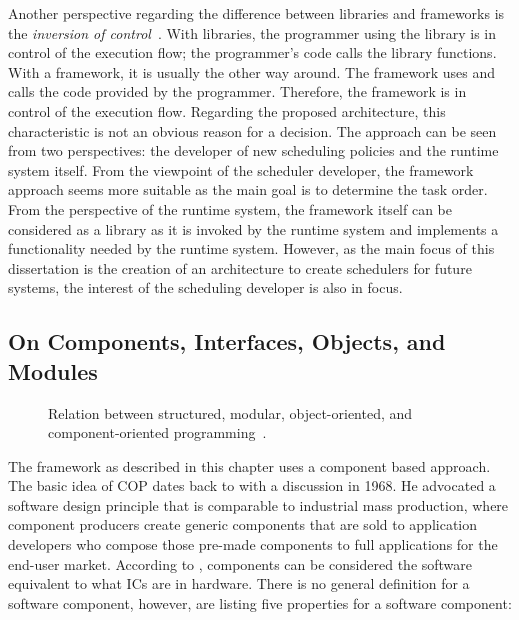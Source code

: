 Another perspective regarding the difference between libraries and frameworks is the \emph{inversion of control}~\cite[\cf{}][]{Fayad-1997-Frameworks}. With libraries, the programmer using the library is in control of the execution flow; the programmer's code calls the library functions. With a framework, it is usually the other way around. The framework uses and calls the code provided by the programmer. Therefore, the framework is in control of the execution flow. Regarding the proposed \cobas{} architecture, this characteristic is not an obvious reason for a decision. The \cobas{} approach can be seen from two perspectives: the developer of new scheduling policies and the runtime system itself. From the viewpoint of the scheduler developer, the framework approach seems more suitable as the main goal is to determine the task order. From the perspective of the runtime system, the \cobas{} framework itself can be considered as a library as it is invoked by the runtime system and implements a functionality needed by the runtime system. However, as the main focus of this dissertation is the creation of an architecture to create schedulers for future systems, the interest of the scheduling developer is also in focus.

\subsection{On Components, Interfaces, Objects, and Modules}

\begin{figure}[t!] \centering
	\caption[Relation between structured, modular, object-oriented, and
		component-oriented programming.]{Relation between structured, modular, object-oriented, and
		component-oriented programming~\cite[19]{Froehlich-2003-COP}.}%
	\label{fig:intro:cop}
\end{figure}

The \cobas{} framework as described in this chapter uses a component based approach. The basic idea of \ac{COP} dates back to \textcite{McIlroy-1969-SoftwareComponent} with a discussion in 1968. He advocated a software design principle that is comparable to industrial mass production, where component producers create generic components that are sold to application developers who compose those pre-made components to full applications for the end-user market. According to \textcite[8]{Szyperski-2002-ComponentSoftware}, components can be considered the software equivalent to what \acp{IC} are in hardware. There is no general definition for a software component, however, \textcite{Szyperski-2003-Factory} are listing five properties for a software component:

